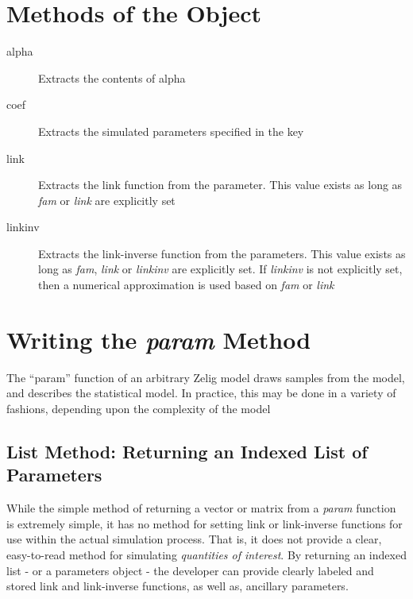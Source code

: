 \section{Methods of the  Object}

\begin{description}

	\item[alpha] Extracts the contents of alpha
	
	\item[coef] Extracts the simulated parameters specified in the key
	
	\item[link] Extracts the link function from the parameter.  This value
		exists as long as \emph{fam} or \emph{link} are explicitly set
	
	\item[linkinv] Extracts the link-inverse function from the parameters.
		This value exists as long as \emph{fam}, \emph{link} or \emph{linkinv}
		are explicitly set.  If \emph{linkinv} is not explicitly set, then a
		numerical approximation is used based on \emph{fam} or \emph{link}
		
\end{description}


\section{Writing the \emph{param} Method}

The ``param'' function of an arbitrary Zelig model draws samples from the
model, and describes the statistical model.  In practice, this may be done
in a variety of fashions, depending upon the complexity of the model


\subsection{List Method: Returning an Indexed List of Parameters}

While the simple method of returning a vector or matrix from a \emph{param} function is extremely simple, it has no method for setting link or link-inverse functions for use within the actual simulation process.  That is, it does not provide a clear, easy-to-read method for simulating \emph{quantities of interest}.  By returning an indexed list - or a parameters object - the developer can provide clearly labeled and stored link and link-inverse functions, as well as, ancillary parameters.


